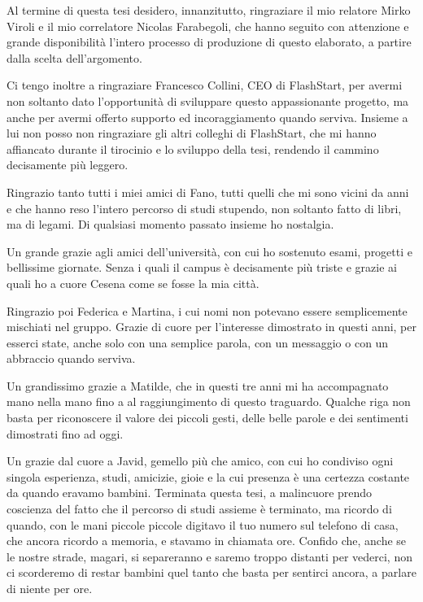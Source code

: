 \documentclass[12pt,a4paper,openright,twoside]{book}
\begin{document}

\backmatter




\begin{acknowledgements} %
Al termine di questa tesi desidero, innanzitutto, ringraziare il mio relatore Mirko Viroli e il mio correlatore Nicolas Farabegoli, che hanno seguito con attenzione e grande disponibilità l'intero processo di produzione di questo elaborato, a partire dalla scelta dell'argomento.

Ci tengo inoltre a ringraziare Francesco Collini, CEO di FlashStart, per avermi non soltanto dato l'opportunità di sviluppare questo appassionante progetto, ma anche per avermi offerto supporto ed incoraggiamento quando serviva.
Insieme a lui non posso non ringraziare gli altri colleghi di FlashStart, che mi hanno affiancato durante il tirocinio e lo sviluppo della tesi, rendendo il cammino decisamente più leggero.

Ringrazio tanto tutti i miei amici di Fano, tutti quelli che mi sono vicini da anni e che hanno reso l'intero percorso di studi stupendo, non soltanto fatto di libri, ma di legami.
Di qualsiasi momento passato insieme ho nostalgia.

Un grande grazie agli amici dell'università, con cui ho sostenuto esami, progetti e bellissime giornate.
Senza i quali il campus è decisamente più triste e grazie ai quali ho a cuore Cesena come se fosse la mia città.

Ringrazio poi Federica e Martina, i cui nomi non potevano essere semplicemente mischiati nel gruppo.
Grazie di cuore per l'interesse dimostrato in questi anni, per esserci state, anche solo con una semplice parola, con un messaggio o con un abbraccio quando serviva.

Un grandissimo grazie a Matilde, che in questi tre anni mi ha accompagnato mano nella mano fino a al raggiungimento di questo traguardo.
Qualche riga non basta per riconoscere il valore dei piccoli gesti, delle belle parole e dei sentimenti dimostrati fino ad oggi.

Un grazie dal cuore a Javid, gemello più che amico, con cui ho condiviso ogni singola esperienza, studi, amicizie, gioie e la cui presenza è una certezza costante da quando eravamo bambini.
Terminata questa tesi, a malincuore prendo coscienza del fatto che il percorso di studi assieme è terminato, ma ricordo di quando, con le mani piccole piccole digitavo il tuo numero sul telefono di casa, che ancora ricordo a memoria, e stavamo in chiamata ore.
Confido che, anche se le nostre strade, magari, si separeranno e saremo troppo distanti per vederci, non ci scorderemo di restar bambini quel tanto che basta per sentirci ancora, a parlare di niente per ore.


\end{acknowledgements}
\end{document}

